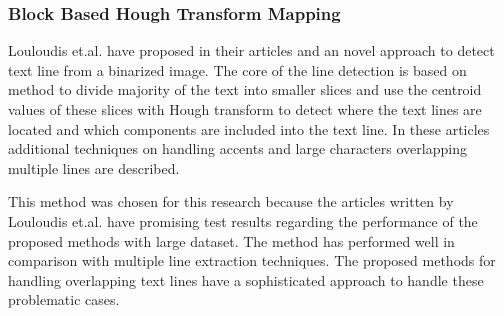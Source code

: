 \documentclass{article}
\begin{document}
        \subsubsection{Block Based Hough Transform Mapping}
          Louloudis et.al. have proposed in their articles \cite{Louloudis1} and \cite{Louloudis2} an novel approach to detect text line from a binarized image. The core of the line detection is based on method to divide majority of the text into smaller slices and use the centroid values of these slices with Hough transform to detect where the text lines are located and which components are included into the text line. In these articles additional techniques on handling accents and large characters overlapping multiple lines are described.

          This method was chosen for this research because the articles written by Louloudis et.al. have promising test results regarding the performance of the proposed methods with large dataset. The method has performed well in comparison with multiple line extraction techniques.\cite{Razak} The proposed methods for handling overlapping text lines have a sophisticated approach to handle these problematic cases.
\end{document}
